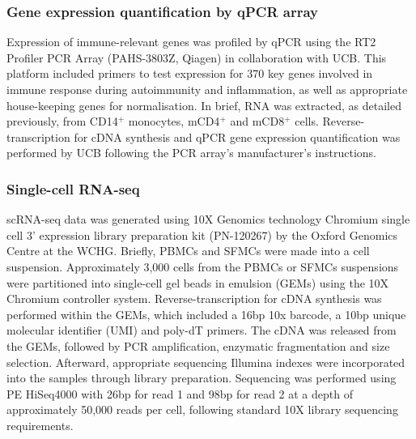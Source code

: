 \subsubsection{Gene expression quantification by qPCR array}
Expression of immune-relevant genes was profiled by qPCR using the RT2 Profiler PCR Array (PAHS-3803Z, Qiagen) in collaboration with UCB. This platform included primers to test expression for 370 key genes involved in immune response during autoimmunity and inflammation, as well as appropriate house-keeping genes for normalisation. In brief, RNA was extracted, as detailed previously, from CD14$^+$ monocytes, mCD4$^+$ and mCD8$^+$ cells. Reverse-transcription for cDNA synthesis and qPCR gene expression quantification was performed by UCB following the PCR array's manufacturer’s instructions.  

\subsubsection{Single-cell RNA-seq} 
\label{scRNA_processing}
scRNA-seq data was generated using 10X Genomics technology Chromium single cell 3' expression library preparation kit (PN-120267) by the Oxford Genomics Centre at the WCHG. Briefly, PBMCs and SFMCs were made into a cell suspension. Approximately 3,000 cells from the PBMCs or SFMCs suspensions were partitioned into single-cell gel beads in emulsion (GEMs) using the 10X Chromium controller system. Reverse-transcription for cDNA synthesis was performed within the GEMs, which included a 16bp 10x barcode, a 10bp unique molecular identifier (UMI) and poly-dT primers. The cDNA was released from the GEMs, followed by PCR amplification, enzymatic fragmentation and size selection. Afterward, appropriate sequencing Illumina indexes were incorporated into the samples through library preparation. Sequencing was performed using PE HiSeq4000 with 26bp for read 1 and 98bp for read 2 at a depth of approximately 50,000 reads per cell, following standard 10X library sequencing requirements. 



